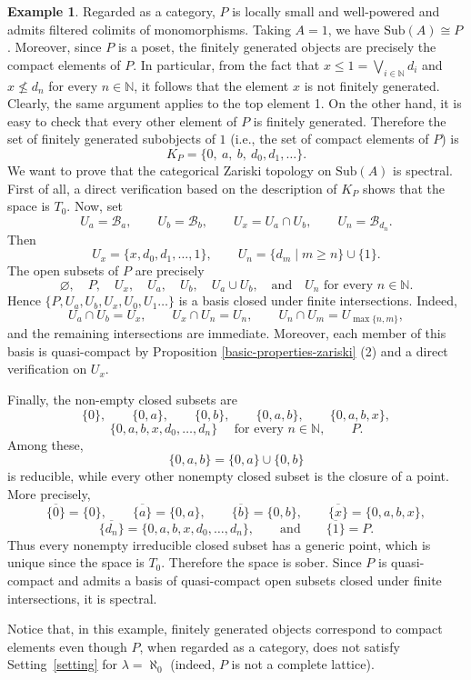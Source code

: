 \documentclass{amsproc}
\theoremstyle{definition}
\newtheorem{example}[theorem]{Example}
\theoremstyle{plain}
\theoremstyle{remark}
\numberwithin{equation}{section}
\newcommand{\Cal}[1]{{\mathcal #1}}
\newcommand{\sub}[1]{\mathrm{Sub} (#1)}
\begin{document}
\begin{example}
Regarded as a category, $P$ is locally small and well-powered and admits filtered colimits of monomorphisms. Taking $A=1$, we have $\sub A\cong P$. Moreover, since $P$ is a poset, the finitely generated objects are precisely the compact elements of $P$. In particular, from the fact that $x\leq 1=\bigvee_{i \in \mathbb N}d_i$ and $x\nleq d_n$ for every $n \in \mathbb N$, it follows that the element $x$ is not finitely generated. Clearly, the same argument applies to the top element 1. On the other hand, it is easy to check that every other element of $P$ is finitely generated. Therefore the set of finitely generated subobjects of $1$  (i.e., the set of compact elements of $P$) is
$$
K_P=\{0,\ a,\ b,\ d_0,d_1,\ldots\}.
$$
We want to prove that the categorical Zariski topology on $\sub A$ is spectral. First of all, a direct verification based on the description of $K_P$ shows that the space is $T_0$. Now, set
$$
U_a=\Cal B_a,\qquad
U_b=\Cal B_b,\qquad
U_x=U_a\cap U_b,\qquad
U_n=\Cal B_{d_n}.
$$
Then
$$
U_x=\{x,d_0,d_1,\ldots,1\},
\qquad
U_n=\{d_m\mid m\geq n\}\cup\{1\}.
$$
The open subsets of $P$ are precisely
$$
\varnothing,\quad P,\quad
U_x,\quad U_a,\quad U_b,\quad U_a\cup U_b,\quad
\text{and} \quad
U_n \text{ for every } n \in \mathbb N .
$$
Hence $\{P,U_a,U_b,U_x,U_0, U_1\dots \}$ is a basis closed under finite intersections. Indeed,
$$
U_a\cap U_b=U_x,\qquad
U_x\cap U_n=U_n,\qquad
U_n\cap U_m=U_{\max\{n,m\}},
$$
and the remaining intersections are immediate. Moreover, each member of this basis is quasi-compact by Proposition \ref{basic-properties-zariski} (2) and a direct verification on $U_x$.

Finally, the non-empty closed subsets are
$$
\{0\},\qquad
\{0,a\},\qquad
\{0,b\},\qquad
\{0,a,b\},\qquad
\{0,a,b,x\},
$$
$$
\{0,a,b,x,d_0,\ldots,d_n\}\quad \text{ for every } n\in\mathbb N,
\qquad
P.
$$
Among these,
$$
\{0,a,b\}=\{0,a\}\cup\{0,b\}
$$
is reducible, while every other nonempty closed subset is the closure of a point. More precisely,
$$
\overline{\{0\}}=\{0\},\qquad
\overline{\{a\}}=\{0,a\},\qquad
\overline{\{b\}}=\{0,b\}, \qquad
\overline{\{x\}}=\{0,a,b,x\},
$$
$$
\overline{\{d_n\}}=\{0,a,b,x,d_0,\ldots,d_n\}, \qquad \text{and}\qquad 
\overline{\{1\}}=P.
$$
Thus every nonempty irreducible closed subset has a generic point, which is unique since the space is $T_0$. Therefore the space is sober. Since $P$ is quasi-compact and admits a basis of quasi-compact open subsets closed under finite intersections, it is spectral.

Notice that, in this example, finitely generated objects correspond to compact elements even though $P$, when regarded as a category, does not satisfy Setting~\ref{setting} for $\lambda=\aleph_0$ (indeed, $P$ is not a complete lattice).
\end{example}
\end{document}
